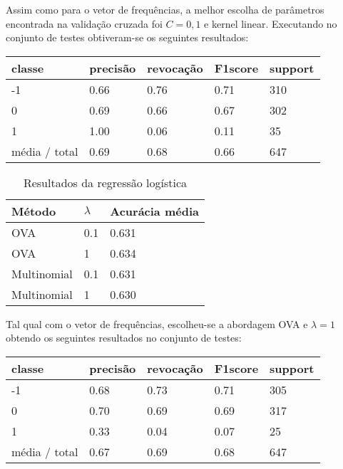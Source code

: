 Assim como para o vetor de frequências, a melhor escolha de parâmetros encontrada na validação
cruzada foi $C = 0,1$ e kernel linear. Executando no conjunto de testes obtiveram-se os seguintes
resultados:

\begin{table}[H]
	\centering
		\begin{tabular}{l | l | l | l | l}
		\hline
		classe  	&	precisão  &  revocação &  F1\-score &  support \\
		\hline
         -1    &   0.66   &   0.76  &    0.71    &   310 \\
         \hline
          0     &  0.69   &   0.66   &   0.67    &   302 \\
         \hline
          1     &  1.00  &    0.06   &   0.11    &    35 \\
		\hline
		média / total    &   0.69   &   0.68   &   0.66    &   647 \\
		\hline
	\end{tabular}
\end{table}

\begin{table}[H]
	\centering
	\caption{Resultados da regressão logística}
	\begin{tabular}{l l l}
		\hline
		Método & $\lambda$ & Acurácia média \\
		\hline
		OVA & 0.1 & 0.631 \\
		\hline
		OVA & 1 & 0.634 \\
		\hline
		Multinomial & 0.1 & 0.631 \\
		\hline
		Multinomial & 1 & 0.630 \\
		\hline
	\end{tabular}
\end{table}

Tal qual com o vetor de frequências, escolheu-se a abordagem OVA e $\lambda = 1$ obtendo os seguintes
resultados no conjunto de testes:

\begin{table}[H]
	\centering
		\begin{tabular}{l | l | l | l | l}
		\hline
		classe  	&	precisão  &  revocação &  F1\-score &  support \\
		\hline
		 -1    &   0.68   &   0.73  &    0.71   &    305 \\
		 \hline
          0    &   0.70   &   0.69   &   0.69   &    317 \\
          \hline
          1   &    0.33   &   0.04   &   0.07   &     25 \\
		 \hline
		média / total    &   0.67   &   0.69  &    0.68   &    647 \\
		\hline
	\end{tabular}
\end{table}

